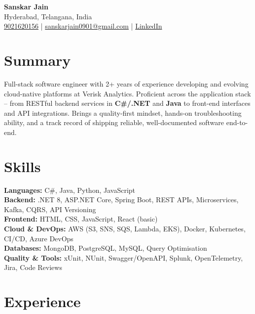 \documentclass[a4paper,10pt]{article}
\begin{document}
\begin{center}
    {\LARGE \textbf{Sanskar Jain}} \\
    Hyderabad, Telangana, India \\
    \href{tel:9021620156}{9021620156} \;|\;
    \href{mailto:sanskarjain0901@gmail.com}{sanskarjain0901@gmail.com} \;|\;
    \href{https://www.linkedin.com/in/sanskar-jain0901/}{LinkedIn}
\end{center}

\vspace{3pt}

\section*{Summary}
Full-stack software engineer with 2+ years of experience developing and evolving cloud-native platforms at Verisk Analytics.
Proficient across the application stack -- from RESTful backend services in \textbf{C\#/.NET} and \textbf{Java} to front-end interfaces and API integrations.
Brings a quality-first mindset, hands-on troubleshooting ability, and a track record of shipping reliable, well-documented software end-to-end.

\section*{Skills}
\textbf{Languages:} C\#, Java, Python, JavaScript \\
\textbf{Backend:} .NET 8, ASP.NET Core, Spring Boot, REST APIs, Microservices, Kafka, CQRS, API Versioning \\
\textbf{Frontend:} HTML, CSS, JavaScript, React (basic) \\
\textbf{Cloud \& DevOps:} AWS (S3, SNS, SQS, Lambda, EKS), Docker, Kubernetes, CI/CD, Azure DevOps \\
\textbf{Databases:} MongoDB, PostgreSQL, MySQL, Query Optimisation \\
\textbf{Quality \& Tools:} xUnit, NUnit, Swagger/OpenAPI, Splunk, OpenTelemetry, Jira, Code Reviews

\section*{Experience}
\end{document}
